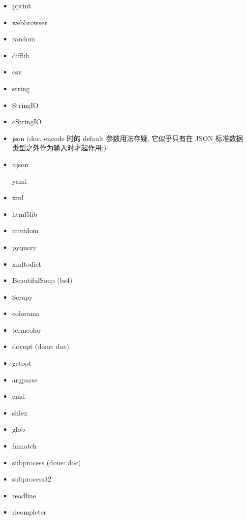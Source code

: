 \documentclass{article}
\begin{document}
\begin{enumerate}
\begin{itemize}
            \item pprint
            \item webbrowser
            \item random
            \item difflib
            \item csv

            \item string
            \item StringIO
            \item cStringIO

            \item json (doc, encode 时的 default 参数用法存疑, 它似乎只有在 JSON 标准数据类型之外作为输入时才起作用;)
            \item ujson

            \itme yaml

            \item xml
            \item html5lib
            \item minidom
            \item pyquery
            \item xmltodict
            \item BeautifulSoup (bs4)
            \item Scrapy

            \item colorama
            \item termcolor
            \item docopt (done: doc)
            \item getopt
            \item argparse
            \item cmd
            \item shlex
            \item glob
            \item fnmatch
            \item subprocess (done: doc)
            \item subprocess32
            \item readline
            \item rlcompleter


\end{itemize}
\end{enumerate}
\end{document}
